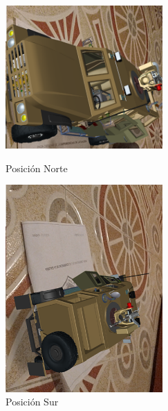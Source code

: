 \begin{figure}[H]
	\begin{minipage}{0.48\textwidth}
	\centering
		\includegraphics[width=6cm]{desarrollo/secciones/pruebas/Vuforia/img/2.png}
		\caption{Posición Norte}
		\label{fig:vuforiaNorte}
	\end{minipage}\hfill
	\begin{minipage}{0.48\textwidth}
	\centering
	\includegraphics[width=6cm]{desarrollo/secciones/pruebas/Vuforia/img/6.png}
	\caption{Posición Sur}
	\label{fig:vuforiaSur}
	\end{minipage}\hfill
\end{figure}

